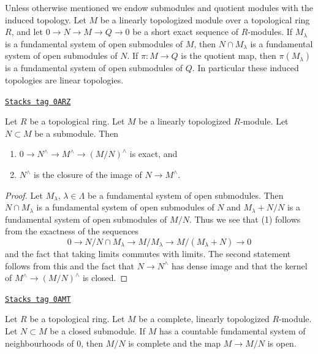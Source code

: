 Unless otherwise mentioned we endow submodules and quotient modules
with the induced topology. Let $M$ be a linearly topologized module
over a topological ring $R$, and let $0 \to N \to M \to Q \to 0$
be a short exact sequence of $R$-modules. If $M_\lambda$ is a
fundamental system of open submodules of $M$, then
$N \cap M_\lambda$ is a fundamental system of open submodules of $N$.
If $\pi : M \to Q$ is the quotient map, then $\pi(M_\lambda)$ is a
fundamental system of open submodules of $Q$. In particular these induced
topologies are linear topologies.

\begin{lemma}[Closure]
\label{formal-spaces-lemma-closure}
\href{https://stacks.math.columbia.edu/tag/0ARZ}{\texttt{Stacks tag 0ARZ}}

Let $R$ be a topological ring. Let $M$ be a linearly topologized
$R$-module. Let $N \subset M$ be a submodule. Then
\begin{enumerate}
\item $0 \to N^\wedge \to M^\wedge \to (M/N)^\wedge$ is exact, and
\item $N^\wedge$ is the closure of the image of $N \to M^\wedge$.
\end{enumerate}
\end{lemma}

\begin{proof}
Let $M_\lambda$, $\lambda \in \Lambda$ be a fundamental system of
open submodules. Then $N \cap M_\lambda$ is a fundamental system
of open submodules of $N$ and $M_\lambda + N/N$ is a fundamental system
of open submodules of $M/N$. Thus we see that (1) follows from
the exactness of the sequences
$$
0 \to N/N \cap M_\lambda \to M/M_\lambda \to M/(M_\lambda + N) \to 0
$$
and the fact that taking limits commutes with limits. The second
statement follows from this and the fact that $N \to N^\wedge$
has dense image and that the kernel of $M^\wedge \to (M/N)^\wedge$ is closed.
\end{proof}

\begin{lemma}
\label{formal-spaces-lemma-quotient-by-closed}
\href{https://stacks.math.columbia.edu/tag/0AMT}{\texttt{Stacks tag 0AMT}}

Let $R$ be a topological ring. Let $M$ be a complete, linearly topologized
$R$-module. Let $N \subset M$ be a closed submodule. If $M$ has a
countable fundamental system of neighbourhoods of $0$, then
$M/N$ is complete and the map $M \to M/N$ is open.
\end{lemma}

